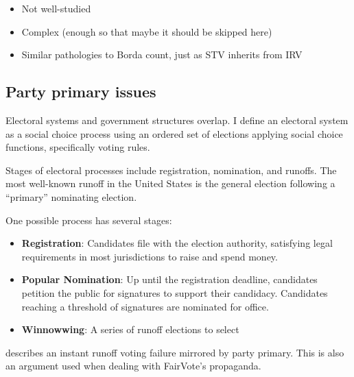 \begin{itemize}
\begin{itemize}
        \item Not well-studied

        \item Complex (enough so that maybe it should be skipped here)

        \item Similar pathologies to Borda count, just as STV inherits from IRV
    \end{itemize}
\end{itemize}



\subsection{Party primary issues}

\begin{boxcomment}
    Electoral systems and government structures overlap.  I define an electoral system as a social choice process using an ordered set of elections applying social choice functions, specifically voting rules.

    Stages of electoral processes include registration, nomination, and runoffs.  The most well-known runoff in the United States is the general election following a ``primary'' nominating election.

    One possible process has several stages:
    \begin{itemize}
        \item \textbf{Registration}:  Candidates file with the election authority, satisfying legal requirements in most jurisdictions to raise and spend money.

        \item \textbf{Popular Nomination}:  Up until the registration deadline, candidates petition the public for signatures to support their candidacy.  Candidates reaching a threshold of signatures are nominated for office.

        \item \textbf{Winnowwing}:  A series of runoff elections to select
    \end{itemize}
\end{boxcomment}

 describes an instant runoff voting failure mirrored by party primary.  This is also an argument used when dealing with FairVote's propaganda.

